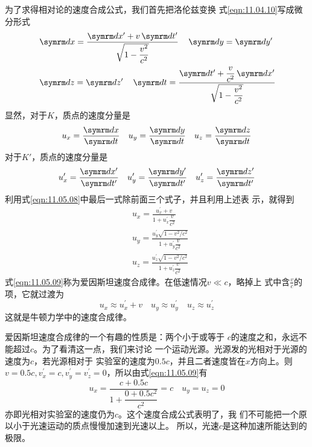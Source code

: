 为了求得相对论的速度合成公式，我们首先把洛伦兹变换
\lhbrak 式\eqref{eqn:11.04.10}\rhbrak 写成微分形式
\begin{equation}\label{eqn:11.05.08}
    \begin{aligned}
        & \dif x=\frac{ \dif x^{\prime}+v  \dif t^{\prime}}{\sqrt{1-\dfrac{v^{2}}{c^{2}}}} \quad  \dif y= \dif y^{\prime} \\
        & \dif z= \dif z^{\prime} \quad  \dif t=\frac{ \dif t^{\prime}+\dfrac{v}{c^{2}}  \dif x^{\prime}}{\sqrt{1-\dfrac{v^{2}}{c^{2}}}}
    \end{aligned}
\end{equation}
显然，对于$ K $，质点的速度分量是
\begin{equation*}
    u _ { x } = \frac {  \dif x } {  \dif t }
    \quad
    u _ { y } = \frac {  \dif y } {  \dif t }
    \quad
    u _ { z } = \frac {  \dif z } {  \dif t }
\end{equation*}
对于$ K ' $，质点的速度分量是
\begin{equation*}
    u _ x ^ { \prime } = \frac {  \dif x ^ { \prime } } {  \dif t ^ { \prime } }
    \quad
    u _ y ^ { \prime } = \frac {  \dif y ^ { \prime } } {  \dif t ^ { \prime } }
    \quad
    u _ z ^ { \prime } = \frac {  \dif z ^ { \prime } } {  \dif t ^ { \prime } }
\end{equation*}
利用式\eqref{eqn:11.05.08}中最后一式除前面三个式子，并且利用上述表
示，就得到
\begin{equation}\label{eqn:11.05.09}
    \begin{aligned}
        &u_{x}=\frac{u_{x}^{\prime}+v}{1+u_{x}^{\prime} \dfrac{v}{c^{2}}} \\
        &u_{y}=\frac{u_{y}^{\prime} \sqrt{1-v^{2} / c^{2}}}{1+u_{y}^{\prime} \dfrac{v}{c^{2}}} \\
        &u_{z}=\frac{u_{z}^{\prime} \sqrt{1-v^{2} / c^{2}}}{1+u_{z}^{\prime} \dfrac{v}{c^{2}}}
    \end{aligned}
\end{equation}
式\eqref{eqn:11.05.09}称为爱因斯坦速度合成律。在低速情况$ v \ll c $，略掉上
式中含$ \frac { v } { c } $的项，它就过渡为
\begin{equation*}
    u _ { x } \approx u _ { x } ^ { \prime } + v
    \quad
    u _ { y } \approx u _ { y } ^ { \prime }
    \quad
    u _ { z } \approx u _ { z } ^ { \prime }
\end{equation*}
这就是牛顿力学中的速度合成律。

爱因斯坦速度合成律的一个有趣的性质是：两个小于或等于
$ c $的速度之和，永远不能超过$ c $。为了看清这一点，我们来讨论
一个运动光源。光源发的光相对于光源的速度为$ c $，若光源相对于
实验室的速度为$ 0.5c $，并且二者速度皆在$ x $方向上。则$  v = 0 . 5 c,
v _ x ^ { \prime } = c, v _ { y } ^ { \prime } = v _ { z } ^ { \prime } = 0 $，所以由式\eqref{eqn:11.05.09}有
\begin{equation*}
    u _ { x } = \frac { c + 0 . 5 c } { 1 + \dfrac { 0 + 0 . 5 c ^ { 2 } } { c ^ { 2 } } } = c
    \quad
    u _ { y } = u _ { z } = 0
\end{equation*}
亦即光相对实验室的速度仍为$ c $。这个速度合成公式表明了，我
们不可能把一个原以小于光速运动的质点慢慢加速到光速以上。
所以，光速$ c $是这种加速所能达到的极限。

